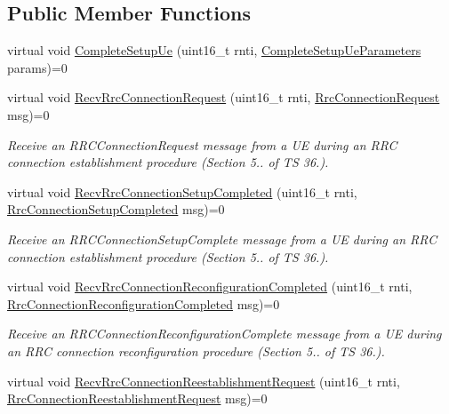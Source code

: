 \subsection*{Public Member Functions}
\begin{DoxyCompactItemize}
\item 
virtual void \hyperlink{classns3_1_1LteEnbRrcSapProvider_acc43a1e7e8a4a6f5e6645066e9253060}{Complete\+Setup\+Ue} (uint16\+\_\+t rnti, \hyperlink{structns3_1_1LteEnbRrcSapProvider_1_1CompleteSetupUeParameters}{Complete\+Setup\+Ue\+Parameters} params)=0
\item 
virtual void \hyperlink{classns3_1_1LteEnbRrcSapProvider_a6a49a245760fe748a1e959e92c9cc313}{Recv\+Rrc\+Connection\+Request} (uint16\+\_\+t rnti, \hyperlink{structns3_1_1LteRrcSap_1_1RrcConnectionRequest}{Rrc\+Connection\+Request} msg)=0
\begin{DoxyCompactList}\small\item\em Receive an {\itshape R\+R\+C\+Connection\+Request} message from a UE during an R\+RC connection establishment procedure (Section 5.. of TS 36.). \end{DoxyCompactList}\item 
virtual void \hyperlink{classns3_1_1LteEnbRrcSapProvider_aa167fea38bb3d88f6c87a4fbfbb2669e}{Recv\+Rrc\+Connection\+Setup\+Completed} (uint16\+\_\+t rnti, \hyperlink{structns3_1_1LteRrcSap_1_1RrcConnectionSetupCompleted}{Rrc\+Connection\+Setup\+Completed} msg)=0
\begin{DoxyCompactList}\small\item\em Receive an {\itshape R\+R\+C\+Connection\+Setup\+Complete} message from a UE during an R\+RC connection establishment procedure (Section 5.. of TS 36.). \end{DoxyCompactList}\item 
virtual void \hyperlink{classns3_1_1LteEnbRrcSapProvider_a551d1002a06181295debe624dfd1322b}{Recv\+Rrc\+Connection\+Reconfiguration\+Completed} (uint16\+\_\+t rnti, \hyperlink{structns3_1_1LteRrcSap_1_1RrcConnectionReconfigurationCompleted}{Rrc\+Connection\+Reconfiguration\+Completed} msg)=0
\begin{DoxyCompactList}\small\item\em Receive an {\itshape R\+R\+C\+Connection\+Reconfiguration\+Complete} message from a UE during an R\+RC connection reconfiguration procedure (Section 5.. of TS 36.). \end{DoxyCompactList}\item 
virtual void \hyperlink{classns3_1_1LteEnbRrcSapProvider_a205d3d264d52fa434896589d48d8210e}{Recv\+Rrc\+Connection\+Reestablishment\+Request} (uint16\+\_\+t rnti, \hyperlink{structns3_1_1LteRrcSap_1_1RrcConnectionReestablishmentRequest}{Rrc\+Connection\+Reestablishment\+Request} msg)=0

\end{DoxyCompactItemize}

